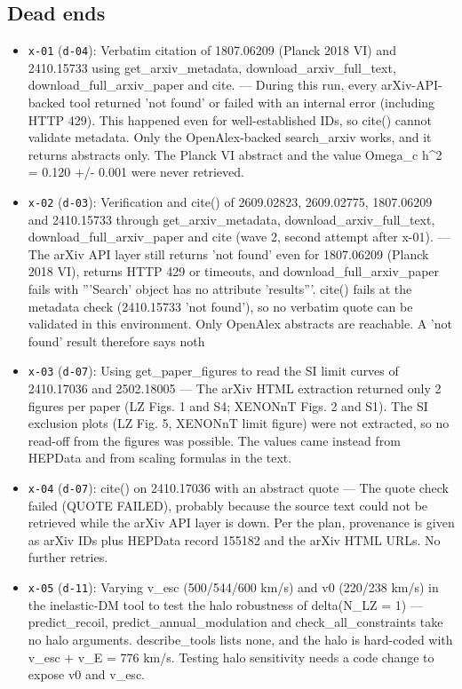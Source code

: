 \documentclass[11pt,a4paper]{article}
\begin{document}
\subsection{Dead ends}
\begin{itemize}
  \item \texttt{x-01} (\texttt{d-04}): Verbatim citation of 1807.06209 (Planck 2018 VI) and 2410.15733 using get\_arxiv\_metadata, download\_arxiv\_full\_text, download\_full\_arxiv\_paper and cite. --- During this run, every arXiv-API-backed tool returned 'not found' or failed with an internal error (including HTTP 429). This happened even for well-established IDs, so cite() cannot validate metadata. Only the OpenAlex-backed search\_arxiv works, and it returns abstracts only. The Planck VI abstract and the value Omega\_c h\textasciicircum{}2 = 0.120 +/- 0.001 were never retrieved.
  \item \texttt{x-02} (\texttt{d-03}): Verification and cite() of 2609.02823, 2609.02775, 1807.06209 and 2410.15733 through get\_arxiv\_metadata, download\_arxiv\_full\_text, download\_full\_arxiv\_paper and cite (wave 2, second attempt after x-01). --- The arXiv API layer still returns 'not found' even for 1807.06209 (Planck 2018 VI), returns HTTP 429 or timeouts, and download\_full\_arxiv\_paper fails with '''Search' object has no attribute 'results'''. cite() fails at the metadata check (2410.15733 'not found'), so no verbatim quote can be validated in this environment. Only OpenAlex abstracts are reachable. A 'not found' result therefore says noth
  \item \texttt{x-03} (\texttt{d-07}): Using get\_paper\_figures to read the SI limit curves of 2410.17036 and 2502.18005 --- The arXiv HTML extraction returned only 2 figures per paper (LZ Figs. 1 and S4; XENONnT Figs. 2 and S1). The SI exclusion plots (LZ Fig. 5, XENONnT limit figure) were not extracted, so no read-off from the figures was possible. The values came instead from HEPData and from scaling formulas in the text.
  \item \texttt{x-04} (\texttt{d-07}): cite() on 2410.17036 with an abstract quote --- The quote check failed (QUOTE FAILED), probably because the source text could not be retrieved while the arXiv API layer is down. Per the plan, provenance is given as arXiv IDs plus HEPData record 155182 and the arXiv HTML URLs. No further retries.
  \item \texttt{x-05} (\texttt{d-11}): Varying v\_esc (500/544/600 km/s) and v0 (220/238 km/s) in the inelastic-DM tool to test the halo robustness of delta(N\_LZ = 1) --- predict\_recoil, predict\_annual\_modulation and check\_all\_constraints take no halo arguments. describe\_tools lists none, and the halo is hard-coded with v\_esc + v\_E = 776 km/s. Testing halo sensitivity needs a code change to expose v0 and v\_esc.

\end{itemize}
\end{document}
